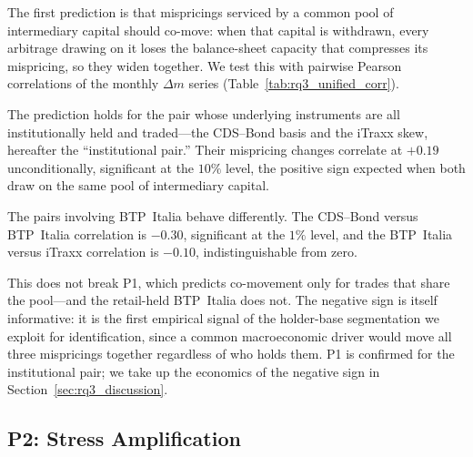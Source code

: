 The first prediction is that mispricings serviced by a common pool of
intermediary capital should co-move: when that capital is withdrawn,
every arbitrage drawing on it loses the balance-sheet capacity that
compresses its mispricing, so they widen together. We test this with
pairwise Pearson correlations of the monthly $\Delta m$ series
(Table~\ref{tab:rq3_unified_corr}).

The prediction holds for the pair whose underlying instruments are all
institutionally held and traded---the CDS--Bond basis and the iTraxx
skew, hereafter the ``institutional pair.'' Their mispricing changes
correlate at $+0.19$ unconditionally, significant at the $10\%$ level,
the positive sign expected when both draw on the same pool of
intermediary capital.

The pairs involving BTP~Italia behave differently. The CDS--Bond
versus BTP~Italia correlation is $-0.30$, significant at the $1\%$
level, and the BTP~Italia versus iTraxx correlation is $-0.10$,
indistinguishable from zero.

This does not break P1, which predicts co-movement only for trades
that share the pool---and the retail-held BTP~Italia does not. The negative
sign is itself informative: it is the first empirical signal of the
holder-base segmentation we exploit for identification, since a
common macroeconomic driver would move all three mispricings together
regardless of who holds them. P1 is confirmed for the institutional
pair; we take up the economics of the negative sign in
Section~\ref{sec:rq3_discussion}.


\subsection{P2: Stress Amplification}
\label{sec:rq3_p2}

